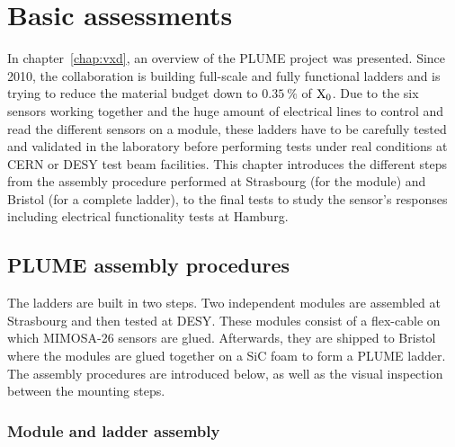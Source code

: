 \chapter{Basic assessments}
\label{chap:labTests}

  In chapter~\ref{chap:vxd}, an overview of the \gls{PLUME} project was presented.
  Since 2010, the collaboration is building full-scale and fully functional ladders and is trying to reduce the material budget down to $0.35~\%$ of $\rm{X_{0}}$.
  Due to the six sensors working together and the huge amount of electrical lines to control and read the different sensors on a module, these ladders have to be carefully tested and validated in the laboratory before performing tests under real conditions at \gls{CERN} or \gls{DESY} test beam facilities.
  This chapter introduces the different steps from the assembly procedure performed at Strasbourg (for the module) and Bristol (for a complete ladder), to the final tests to study the sensor's responses including electrical functionality tests at Hamburg.
 
 \minitoc
  

\section{PLUME assembly procedures}

  The ladders are built in two steps. 
  Two independent modules are assembled at Strasbourg and then tested at \gls{DESY}. 
  These modules consist of a flex-cable on which \gls{MIMOSA}-26 sensors are glued.
  Afterwards, they are shipped to Bristol where the modules are glued together on a \gls{SiC} foam to form a \gls{PLUME} ladder.
  The assembly procedures are introduced below, as well as the visual inspection between the mounting steps.

  \subsection{Module and ladder assembly}

